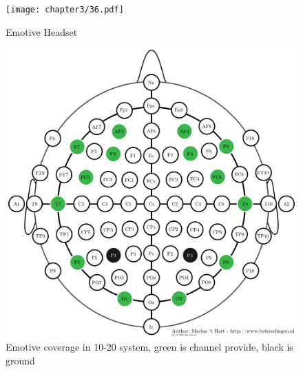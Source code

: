 \begin{figure}[ht]
	\centering
	\texttt{[image: chapter3/36.pdf]}
	\caption{Emotive Headset}
\end{figure}

\begin{figure}[ht]
	\centering
	\includegraphics[scale = 0.5]{chapter3/emotiv_electrodes_cover.pdf}
	\caption{Emotive coverage in 10-20 system, green is channel provide, black is ground}
\end{figure}

